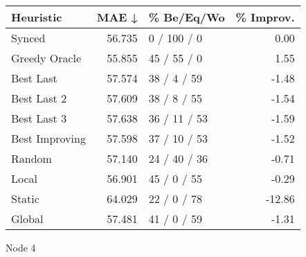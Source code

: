 \begin{tabular}{lrlr}
\toprule
\textbf{Heuristic} & \textbf{MAE ↓} & \textbf{\% Be/Eq/Wo} & \textbf{\% Improv.} \\
\midrule
            Synced &         56.735 &          0 / 100 / 0 &                0.00 \\
     Greedy Oracle &         55.855 &          45 / 55 / 0 &                1.55 \\
         Best Last &         57.574 &          38 / 4 / 59 &               -1.48 \\
       Best Last 2 &         57.609 &          38 / 8 / 55 &               -1.54 \\
       Best Last 3 &         57.638 &         36 / 11 / 53 &               -1.59 \\
    Best Improving &         57.598 &         37 / 10 / 53 &               -1.52 \\
            Random &         57.140 &         24 / 40 / 36 &               -0.71 \\
             Local &         56.901 &          45 / 0 / 55 &               -0.29 \\
            Static &         64.029 &          22 / 0 / 78 &              -12.86 \\
            Global &         57.481 &          41 / 0 / 59 &               -1.31 \\
\bottomrule
\end{tabular}
\caption{Node 4}
\label{tab:iid_lr05_le2_bs2_4}
